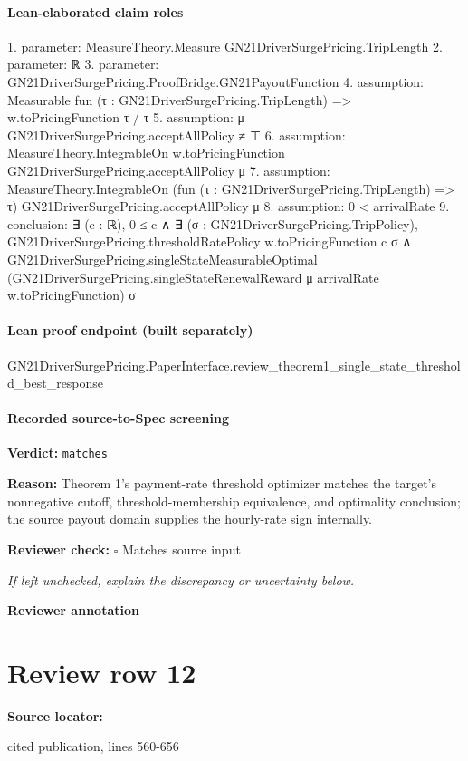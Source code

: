 \documentclass[10pt]{article}
\newcommand{\reviewerbox}{%
  \par\noindent\fbox{\parbox{0.96\linewidth}{\rule{0pt}{0.38in}}}\par
}
\newcommand{\reviewmatch}[1]{%
  \par\noindent\textbf{Reviewer check:} $\square$\; #1\par
  \noindent\emph{If left unchecked, explain the discrepancy or uncertainty below.}\par
}
\begin{document}
\paragraph{Lean-elaborated claim roles}\begin{ReviewVerbatim}
1. parameter: MeasureTheory.Measure GN21DriverSurgePricing.TripLength
2. parameter: ℝ
3. parameter: GN21DriverSurgePricing.ProofBridge.GN21PayoutFunction
4. assumption: Measurable fun (τ : GN21DriverSurgePricing.TripLength) => w.toPricingFunction τ / τ
5. assumption: μ GN21DriverSurgePricing.acceptAllPolicy ≠ ⊤
6. assumption: MeasureTheory.IntegrableOn w.toPricingFunction GN21DriverSurgePricing.acceptAllPolicy μ
7. assumption: MeasureTheory.IntegrableOn (fun (τ : GN21DriverSurgePricing.TripLength) => τ) GN21DriverSurgePricing.acceptAllPolicy μ
8. assumption: 0 < arrivalRate
9. conclusion: ∃ (c : ℝ),
  0 ≤ c ∧
    ∃ (σ : GN21DriverSurgePricing.TripPolicy),
      GN21DriverSurgePricing.thresholdRatePolicy w.toPricingFunction c σ ∧
        GN21DriverSurgePricing.singleStateMeasurableOptimal
          (GN21DriverSurgePricing.singleStateRenewalReward μ arrivalRate w.toPricingFunction) σ
\end{ReviewVerbatim}

\paragraph{Lean proof endpoint (built separately)}\begin{ReviewVerbatim}
GN21DriverSurgePricing.PaperInterface.review_theorem1_single_state_threshold_best_response
\end{ReviewVerbatim}

\paragraph{Recorded source-to-Spec screening}
\textbf{Verdict:} \texttt{matches}
\\
{\raggedright
\textbf{Reason:} Theorem 1's payment-\allowbreak{}rate threshold optimizer matches the target's nonnegative cutoff, threshold-\allowbreak{}membership equivalence, and optimality conclusion;\allowbreak{} the source payout domain supplies the hourly-\allowbreak{}rate sign internally.\allowbreak{}
\par}
\reviewmatch{Matches source input}
\noindent\textbf{Reviewer annotation}\par
\reviewerbox
\clearpage
\hypertarget{source-claim-38fbb9f78eb2c2c7}{}
\section*{Review row 12}
\textbf{Source locator:} {\footnotesize\raggedright cited publication, lines 560-\allowbreak{}656\par}
\end{document}
